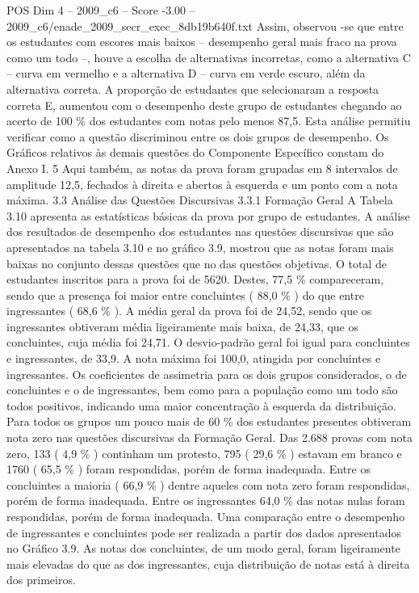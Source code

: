 \begin{textsample}{POS Dim 4 – 2009\_c6 – Score -3.00 – 2009\_c6/enade\_2009\_secr\_exec\_8db19b640f.txt}
Assim, observou -se que entre os estudantes com escores mais baixos – desempenho geral mais fraco na prova como um todo –, houve a escolha de alternativas incorretas, como a alternativa C – curva em vermelho e a alternativa D – curva em verde escuro, além da alternativa correta.
A proporção de estudantes que selecionaram a resposta correta E, aumentou com o desempenho deste grupo de estudantes chegando ao acerto de 100 \% dos estudantes com notas pelo menos 87,5.
Esta análise permitiu verificar como a questão discriminou entre os dois grupos de desempenho.
Os Gráficos relativos às demais questões do Componente Específico constam do Anexo I. 5 Aqui também, as notas da prova foram grupadas em 8 intervalos de amplitude 12,5, fechados à direita e abertos à esquerda e um ponto com a nota máxima. 3.3 Análise das Questões Discursivas 3.3.1 Formação Geral A Tabela 3.10 apresenta as estatísticas básicas da prova por grupo de estudantes.
A análise dos resultados de desempenho dos estudantes nas questões discursivas que são apresentados na tabela 3.10 e no gráfico 3.9, mostrou que as notas foram mais baixas no conjunto dessas questões que no das questões objetivas.
O total de estudantes inscritos para a prova foi de 5620.
Destes, 77,5 \% compareceram, sendo que a presença foi maior entre concluintes ( 88,0 \% ) do que entre ingressantes ( 68,6 \% ).
A média geral da prova foi de 24,52, sendo que os ingressantes obtiveram média ligeiramente mais baixa, de 24,33, que os concluintes, cuja média foi 24,71.
O desvio-padrão geral foi igual para concluintes e ingressantes, de 33,9.
A nota máxima foi 100,0, atingida por concluintes e ingressantes.
Os coeficientes de assimetria para os dois grupos considerados, o de concluintes e o de ingressantes, bem como para a população como um todo são todos positivos, indicando uma maior concentração à esquerda da distribuição.
Para todos os grupos um pouco mais de 60 \% dos estudantes presentes obtiveram nota zero nas questões discursivas da Formação Geral.
Das 2.688 provas com nota zero, 133 ( 4,9 \% ) continham um protesto, 795 ( 29,6 \% ) estavam em branco e 1760 ( 65,5 \% ) foram respondidas, porém de forma inadequada.
Entre os concluintes a maioria ( 66,9 \% ) dentre aqueles com nota zero foram respondidas, porém de forma inadequada.
Entre os ingressantes 64,0 \% das notas nulas foram respondidas, porém de forma inadequada.
Uma comparação entre o desempenho de ingressantes e concluintes pode ser realizada a partir dos dados apresentados no Gráfico 3.9.
As notas dos concluintes, de um modo geral, foram ligeiramente mais elevadas do que as dos ingressantes, cuja distribuição de notas está à direita dos primeiros.

\end{textsample}
